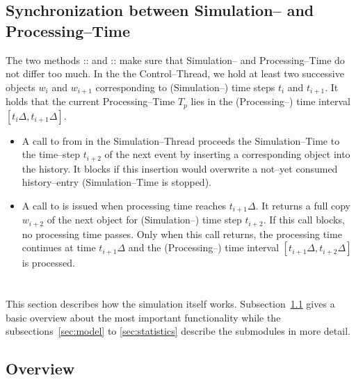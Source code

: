 \subsection{Synchronization between Simulation-- and Processing--Time}\label{sec:time_synchronization}
The two methods :: and :: make sure that Simulation-- and Processing--Time do not differ too much. In the the Control--Thread, we hold at least two successive  objects $w_i$ and $w_{i+1}$ corresponding to (Simulation--) time steps $t_i$ and $t_{i+1}$. It holds that the current Processing--Time $T_p$ lies in the (Processing--) time interval $[t_i\Delta,t_{i+1}\Delta]$.
\begin{itemize}
	\item A call to  from  in the Simulation--Thread proceeds the Simulation--Time to the time--step $t_{i+2}$ of the next event by inserting a corresponding  object into the history. It blocks if this insertion would overwrite a not--yet consumed history--entry (Simulation--Time is stopped).
	\item A call to  is issued when processing time reaches $t_{i+1}\Delta$. It returns a full copy $w_{i+2}$ of the next  object for (Simulation--) time step $t_{i+2}$. If this call blocks, no processing time passes. Only when this call returns, the processing time continues at time $t_{i+1}\Delta$ and the (Processing--) time interval $[t_{i+1}\Delta,t_{i+2}\Delta]$ is processed.
\end{itemize}

\section{}\label{sec:simulationkernel}

This section describes how the simulation itself works. Subsection~\ref{SG:sec:overview} gives a basic overview about the most important functionality while the subsections~\ref{sec:model} to \ref{sec:statistics} describe the submodules in more detail.

\subsection{Overview}\label{SG:sec:overview}

